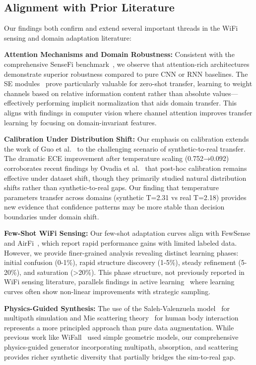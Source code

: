 \documentclass[journal]{IEEEtran}
\begin{document}
\subsection{Alignment with Prior Literature}
Our findings both confirm and extend several important threads in the WiFi sensing and domain adaptation literature:

\textbf{Attention Mechanisms and Domain Robustness:} Consistent with the comprehensive SenseFi benchmark~\cite{yang2023sensefi}, we observe that attention-rich architectures demonstrate superior robustness compared to pure CNN or RNN baselines. The SE modules~\cite{se_networks2018} prove particularly valuable for zero-shot transfer, learning to weight channels based on relative information content rather than absolute values—effectively performing implicit normalization that aids domain transfer. This aligns with findings in computer vision where channel attention improves transfer learning by focusing on domain-invariant features.

\textbf{Calibration Under Distribution Shift:} Our emphasis on calibration extends the work of Guo et al.~\cite{calibration_guo2017} to the challenging scenario of synthetic-to-real transfer. The dramatic ECE improvement after temperature scaling (0.752→0.092) corroborates recent findings by Ovadia et al.~\cite{ovadia2019trust} that post-hoc calibration remains effective under dataset shift, though they primarily studied natural distribution shifts rather than synthetic-to-real gaps. Our finding that temperature parameters transfer across domains (synthetic T=2.31 vs real T=2.18) provides new evidence that confidence patterns may be more stable than decision boundaries under domain shift.

\textbf{Few-Shot WiFi Sensing:} Our few-shot adaptation curves align with FewSense~\cite{fewsense2022} and AirFi~\cite{airfi2022}, which report rapid performance gains with limited labeled data. However, we provide finer-grained analysis revealing distinct learning phases: initial confusion (0-1\%), rapid structure discovery (1-5\%), steady refinement (5-20\%), and saturation (>20\%). This phase structure, not previously reported in WiFi sensing literature, parallels findings in active learning~\cite{settles2009active} where learning curves often show non-linear improvements with strategic sampling.

\textbf{Physics-Guided Synthesis:} The use of the Saleh-Valenzuela model~\cite{saleh1987statistical} for multipath simulation and Mie scattering theory~\cite{mie1908beitrage} for human body interaction represents a more principled approach than pure data augmentation. While previous work like WiFall~\cite{wifall2016} used simple geometric models, our comprehensive physics-guided generator incorporating multipath, absorption, and scattering provides richer synthetic diversity that partially bridges the sim-to-real gap.
\end{document}
